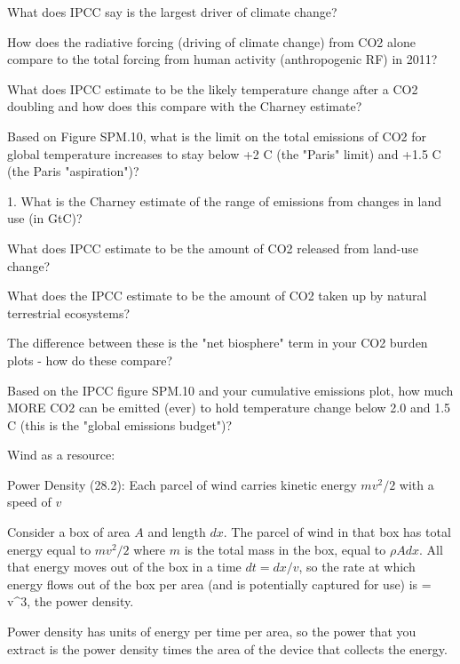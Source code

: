 \documentclass[11pt]{book}
\begin{document}
\bee
\item What does IPCC say is the largest driver of climate change?
\item How does the radiative forcing (driving of climate change) from CO2 alone compare to the total forcing from human activity (anthropogenic RF) in 2011?
\item What does IPCC estimate to be the likely temperature change after a CO2 doubling and how does this compare with the Charney estimate?
\item Based on Figure SPM.10, what is the limit on the total emissions of CO2 for global temperature increases to stay below +2 C (the "Paris" limit) and +1.5 C (the Paris "aspiration")?
\eee


\bee
\item 1. What is the Charney estimate of the range of emissions from changes in land use (in GtC)?

\item What does IPCC estimate to be the amount of CO2 released from land-use change?

\item What does the IPCC estimate to be the amount of CO2 taken up by natural terrestrial ecosystems?

\item The difference between these is the "net biosphere" term in your CO2 burden plots - how do these compare?

\item Based on the IPCC figure SPM.10 and your cumulative emissions plot, how much MORE CO2 can be emitted (ever) to hold temperature change below 2.0 and 1.5 C (this is the "global emissions budget")?

\eee


Wind as a resource:
\bee
\item Power Density (28.2): Each parcel of wind carries kinetic energy $mv^2/2$ with a speed of $v$
\item Consider a box of area $A$ and length $dx$. The parcel of wind in that box has total energy equal to $mv^2/2$ where $m$ is the total mass in the box, equal to $\rho Adx$. All that energy moves out of the box in a time $dt=dx/v$, so the rate at which energy flows out of the box per area (and is potentially captured for use) is 
\be
{}= \,\rho v^3\equiv {},
\ee
the power density.
\item Power density has units of energy per time per area, so the power that you extract is the power density times the area of the device that collects the energy.
\eee
{}
\end{document}
